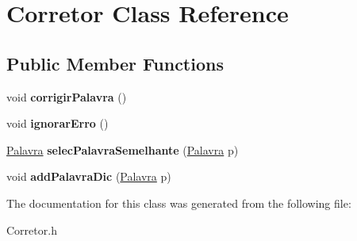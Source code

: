 \hypertarget{classCorretor}{}\section{Corretor Class Reference}
\label{classCorretor}
\subsection*{Public Member Functions}
\begin{DoxyCompactItemize}
\item 
void {\bfseries corrigir\+Palavra} ()\hypertarget{classCorretor_ad8c21144334f38187ba7e7f5c893c0ed}{}\label{classCorretor_ad8c21144334f38187ba7e7f5c893c0ed}

\item 
void {\bfseries ignorar\+Erro} ()\hypertarget{classCorretor_abe691ab7e28b0c628300afa7076c1fe7}{}\label{classCorretor_abe691ab7e28b0c628300afa7076c1fe7}

\item 
\hyperlink{classPalavra}{Palavra} {\bfseries selec\+Palavra\+Semelhante} (\hyperlink{classPalavra}{Palavra} p)\hypertarget{classCorretor_ac5b32fd4f27c6f2221f3b8ff9188f4b7}{}\label{classCorretor_ac5b32fd4f27c6f2221f3b8ff9188f4b7}

\item 
void {\bfseries add\+Palavra\+Dic} (\hyperlink{classPalavra}{Palavra} p)\hypertarget{classCorretor_ad43d884ea23584034efd602e9fc299cc}{}\label{classCorretor_ad43d884ea23584034efd602e9fc299cc}

\end{DoxyCompactItemize}


The documentation for this class was generated from the following file\+:\begin{DoxyCompactItemize}
\item 
Corretor.\+h\end{DoxyCompactItemize}
